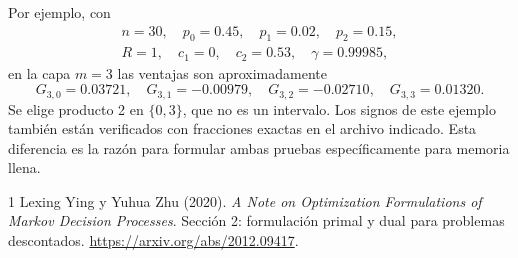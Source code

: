 \documentclass[11pt,a4paper]{article}
\begin{document}
Por ejemplo, con
\[
\begin{gathered}
n=30,\quad p_0=0.45,\quad p_1=0.02,\quad p_2=0.15,\\
R=1,\quad c_1=0,\quad c_2=0.53,\quad\gamma=0.99985,
\end{gathered}
\]
en la capa $m=3$ las ventajas son aproximadamente
\[
G_{3,0}=0.03721,\quad G_{3,1}=-0.00979,\quad
G_{3,2}=-0.02710,\quad G_{3,3}=0.01320.
\]
Se elige producto 2 en $\{0,3\}$, que no es un intervalo. Los signos
de este ejemplo también están verificados con fracciones exactas en
el archivo indicado. Esta diferencia es la razón para formular ambas
pruebas específicamente para memoria llena.

\begin{thebibliography}{1}
Lexing Ying y Yuhua Zhu (2020).
\emph{A Note on Optimization Formulations of Markov Decision Processes}.
Sección 2: formulación primal y dual para problemas descontados.
\url{https://arxiv.org/abs/2012.09417}.
\end{thebibliography}
\end{document}
